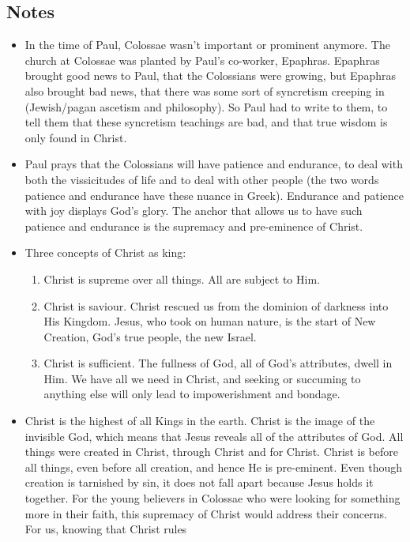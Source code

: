 \subsection*{Notes}
\begin{itemize}
  \item{In the time of Paul, Colossae wasn't important or prominent anymore.
  The church at Colossae was planted by Paul's co-worker, Epaphras.  Epaphras
  brought good news to Paul, that the Colossians were growing, but Epaphras
  also brought bad news, that there was some sort of syncretism creeping in
  (Jewish/pagan ascetism and philosophy).  So Paul had to write to them, to
  tell them that these syncretism teachings are bad, and that true wisdom is
  only found in Christ.}
  \item{Paul prays that the Colossians will have patience and endurance, to
  deal with both the vissicitudes of life and to deal with other people (the
  two words patience and endurance have these nuance in Greek).  Endurance
  and patience with joy displays God's glory.  The anchor that allows us to
  have such patience and endurance is the supremacy and pre-eminence of
  Christ.}
  \item{Three concepts of Christ as king: 
  \begin{enumerate}
    \item{Christ is supreme over all things. All are subject to Him.}
    \item{Christ is saviour.  Christ rescued us from the dominion of darkness
    into His Kingdom.  Jesus, who took on human nature, is the start of New
    Creation, God's true people, the new Israel.}
    \item{Christ is sufficient.  The fullness of God, all of God's
    attributes, dwell in Him.  We have all we need in Christ, and seeking or
    succuming to anything else will only lead to impowerishment and bondage.}
  \end{enumerate}}
  \item{Christ is the highest of all Kings in the earth.  Christ is the image
  of the invisible God, which means that Jesus reveals all of the attributes
  of God.  All things were created in Christ, through Christ and for Christ.
  Christ is before all things, even before all creation, and hence He is
  pre-eminent.  Even though creation is tarnished by sin, it does not fall
  apart because Jesus holds it together.  For the young believers in Colossae
  who were looking for something more in their faith, this supremacy of
  Christ would address their concerns.  For us, knowing that Christ rules
}
\end{itemize}
